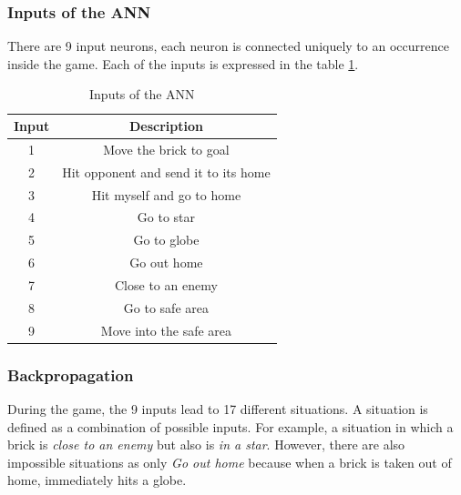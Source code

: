 		\subsubsection{Inputs of the ANN} %
		\label{ssub:inputs}
		There are 9 input neurons, each neuron is connected uniquely to an occurrence inside the game. Each of the inputs is expressed in the table \ref{tab:ann_inputs}.
		\begin{table}[ht]
			\caption{Inputs of the ANN}
			\label{tab:ann_inputs}
			\centering
			\begin{tabular}{ c c }
			\textbf{Input} & \textbf{Description} \\
			\hline
				1 & Move the brick to goal \\
				2 & Hit opponent and send it to its home \\
				3 & Hit myself and go to home \\
				4 & Go to star \\
				5 & Go to globe \\
				6 & Go out home \\
				7 & Close to an enemy \\
				8 & Go to safe area \\
				9 & Move into the safe area \\
			\end{tabular}
		\end{table}

		\subsubsection{Backpropagation} %
		\label{ssub:backpropagation}
		During the game, the 9 inputs lead to 17 different situations. 
		A situation is defined as a combination of possible inputs. 
		For example, a situation in which a brick is \emph{close to an enemy} but also is \emph{in a star}. 
		However, there are also impossible situations as only \emph{Go out home} because when a brick is taken out of home, immediately hits a globe.
		
